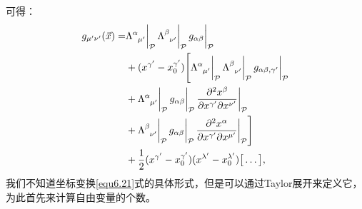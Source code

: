 可得：
\begin{align}
    g_{\mu' \nu'} (\vec{x}) =& \Lambda\indices{^\alpha_{\mu'}} \bigg|_{\mathcal{P}} \, \Lambda\indices{^\beta_{\nu'}} \bigg|_{\mathcal{P}} \, g_{\alpha \beta} \bigg|_{\mathcal{P}} \notag \\
    & + (x^{\gamma'} - x_0^{\gamma'}) \Bigg[ \Lambda\indices{^\alpha_{\mu'}} \bigg|_{\mathcal{P}}\, \Lambda\indices{^\beta_{\nu'}} \bigg|_{\mathcal{P}} \, g_{\alpha \beta, \gamma'} \bigg|_{\mathcal{P}} \notag \\
    & + \Lambda\indices{^\alpha_{\mu'}} \bigg|_{\mathcal{P}}\, g_{\alpha \beta} \bigg|_{\mathcal{P}} \, \frac{ \partial^2 x^\beta }{ \partial x^{\gamma'} \partial x^{\nu'} } \bigg|_{\mathcal{P}}  \notag \\
    & + \Lambda\indices{^\beta_{\nu'}} \bigg|_{\mathcal{P}} \, g_{\alpha \beta} \bigg|_{\mathcal{P}} \, \frac{ \partial^2 x^\alpha }{ \partial x^{\gamma'} \partial x^{\mu'} } \bigg|_{\mathcal{P}} \Bigg] \notag \\
    & + \frac{1}{2} (x^{\gamma'} - x_0^{\gamma'}) (x^{\lambda'} - x_0^{\lambda'}) \big[ \dots \big], \label{equ6.26} 
\end{align}
我们不知道坐标变换\eqref{equ6.21}式的具体形式，但是可以通过Taylor展开来定义它，为此首先来计算自由变量的个数。

